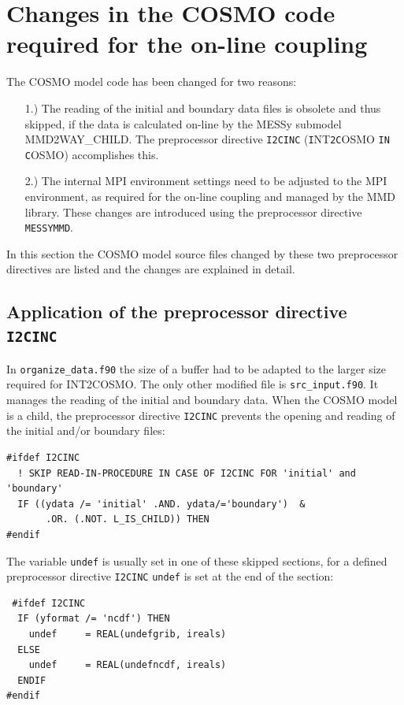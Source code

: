 \documentclass[11pt,twoside]{article}
\begin{document}
\section{Changes in the COSMO code required for the on-line coupling}
\label{sec:COSMOcode}
The COSMO model code has been changed for two reasons:
\begin{itemize}
\item[1.)] The reading of the initial and boundary data files is obsolete and 
thus skipped, if the data
 is calculated on-line by the MESSy submodel MMD2WAY\_CHILD.  The preprocessor directive
{\tt \large I2CINC} ({\tt \large I}{\footnotesize NT}{\tt \large 2C}{\footnotesize OSMO} {\tt \large IN C}{\footnotesize OSMO}) 
accomplishes this.
\item[2.)] The internal MPI environment settings need to be adjusted to 
the MPI environment, as required for the on-line coupling and managed by the MMD 
library. These changes are introduced using the preprocessor directive
{\tt \large MESSYMMD}.
\end{itemize}
In this section the COSMO model source files changed by these two preprocessor 
directives are listed and the changes are explained in detail.

\subsection{Application of the preprocessor directive {\tt \large
I2CINC}}

In \verb|organize_data.f90| the size of a buffer had to be adapted to
the larger size required for INT2COSMO. The only other modified file is
\verb|src_input.f90|. It manages the reading
of the initial and boundary data.
When the COSMO model is a child, the preprocessor directive {\tt \large I2CINC}
prevents the opening and reading of the initial and/or boundary files: 
\begin{verbatim}
#ifdef I2CINC
  ! SKIP READ-IN-PROCEDURE IN CASE OF I2CINC FOR 'initial' and 'boundary'
  IF ((ydata /= 'initial' .AND. ydata/='boundary')  &
       .OR. (.NOT. L_IS_CHILD)) THEN
#endif
\end{verbatim}
The variable \verb|undef| is usually set in one of these skipped sections, for
a defined preprocessor directive {\tt \large I2CINC} \verb|undef| is set at the 
end of the section:
\begin{verbatim}
 #ifdef I2CINC
  IF (yformat /= 'ncdf') THEN
    undef     = REAL(undefgrib, ireals)
  ELSE
    undef     = REAL(undefncdf, ireals)
  ENDIF
#endif
\end{verbatim}
\end{document}
